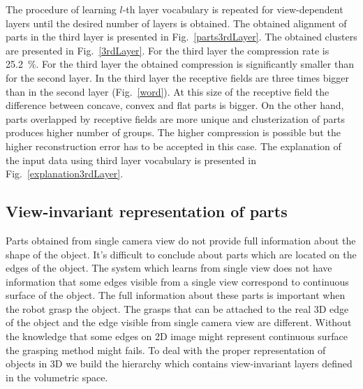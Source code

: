 \documentclass[letterpaper,10pt,conference]{ieeeconf}  %
\begin{document}
The procedure of learning $l$-th layer vocabulary is repeated for view-dependent layers until the desired number of layers is obtained. The obtained alignment of parts in the third layer is presented in Fig.~\ref{parts3rdLayer}. The obtained clusters are presented in Fig.~\ref{3rdLayer}. For the third layer the compression rate is 25.2~\%. For the third layer the obtained compression is significantly smaller than for the second layer. In the third layer the receptive fields are three times bigger than in the second layer (Fig.~\ref{word}). At this size of the receptive field the difference between concave, convex and flat parts is bigger. On the other hand, parts overlapped by receptive fields are more unique and clusterization of parts produces higher number of groups. The higher compression is possible but the higher reconstruction error has to be accepted in this case. The explanation of the input data using third layer vocabulary is presented in Fig.~\ref{explanation3rdLayer}.

\subsection{View-invariant representation of parts}

Parts obtained from single camera view do not provide full information about the shape of the object. It's difficult to conclude about parts which are located on the edges of the object. The system which learns from single view does not have information that some edges visible from a single view correspond to continuous surface of the object. The full information about these parts is important when the robot grasp the object. The grasps that can be attached to the real 3D edge of the object and the edge visible from single camera view are different. Without the knowledge that some edges on 2D image might represent continuous surface the grasping method might fails. To deal with the proper representation of objects in 3D we build the hierarchy which contains view-invariant layers defined in the volumetric space.
\end{document}
